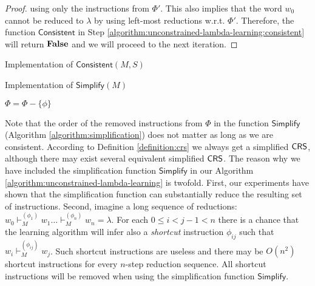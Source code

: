 \begin{proof}
using only the instructions from $\Phi'$. This also implies that the word $w_0$ cannot be reduced to $\lambda$ by using left-most reductions w.r.t. $\Phi'$. Therefore, the function $\mathsf{Consistent}$ in Step \ref{algorithm:unconstrained-lambda-learning:consistent} will return ${\bf False}$ and we will proceed to the next iteration.
\end{proof}

\begin{algorithm}
\caption{Implementation of $\mathsf{Consistent}(M, S)$}
\label{algorithm:consistency}
\LinesNumbered
{}
{\;}
\;
\end{algorithm}

\begin{algorithm}
\caption{Implementation of $\mathsf{Simplify}(M)$}
\label{algorithm:simplification}
\LinesNumbered
{}
{$\Phi = \Phi - \{\phi\}$}
\Return{$(\Sigma, \Phi)$}\;
\end{algorithm}

Note that the order of the removed instructions from $\Phi$ in the function $\mathsf{Simplify}$ (Algorithm \ref{algorithm:simplification}) does not matter as long as we are consistent. According to Definition \ref{definition:crs} we always get a simplified $\mbox{\sf CRS\/}$, although there may exist several equivalent simplified $\mbox{\sf CRS\/}$. The reason why we have included the simplification function $\mathsf{Simplify}$ in our Algorithm \ref{algorithm:unconstrained-lambda-learning} is twofold. First, our experiments have shown that the simplification function can substantially reduce the resulting set of instructions. Second, imagine a long sequence of reductions: $w_0 \vdash_M^{(\phi_1)} w_1 \ldots \vdash_M^{(\phi_n)} w_n = \lambda$. For each $0 \le i < j - 1 < n$ there is a chance that the learning algorithm will infer also a \emph{shortcut} instruction $\phi_{ij}$ such that $w_i \vdash_M^{(\phi_{ij})} w_j$. Such shortcut instructions are useless and there may be $O(n^2)$ shortcut instructions for every $n$-step reduction sequence. All shortcut instructions will be removed when using the simplification function $\mathsf{Simplify}$.
